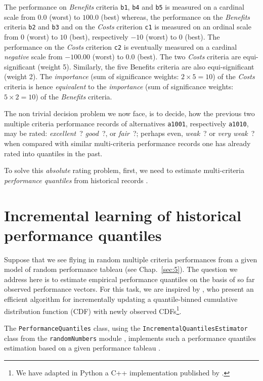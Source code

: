 The performance on \emph{Benefits} criteria \texttt{b1}, \texttt{b4} and \texttt{b5} is measured on a cardinal scale from $0.0$ (worst) to $100.0$ (best) whereas, the performance on the \emph{Benefits} criteria \texttt{b2} and \texttt{b3}  and on the \emph{Costs} criterion \texttt{c1} is measured on an ordinal scale from $0$ (worst) to $10$ (best), respectively $-10$ (worst) to $0$ (best). The performance on the \emph{Costs} criterion \texttt{c2} is eventually measured on a cardinal \emph{negative} scale from $-100.00$ (worst) to $0.0$ (best). The two \emph{Costs} criteria are equi-significant (weight 5). Similarly, the five Benefits criteria are also equi-significant (weight 2). The \emph{importance} (sum of significance weights: $2 \times 5 = 10$) of the \emph{Costs} criteria is hence \emph{equivalent} to the \emph{importance} (sum of significance weights: $5 \times 2 = 10$) of the \emph{Benefits} criteria.
   
The non trivial decision problem we now face, is to decide, how the previous two multiple criteria performance records of alternatives \texttt{a1001}, respectively \texttt{a1010},  may be rated: \emph{excellent}~? \emph{good}~?, or \emph{fair}~?; perhaps even, \emph{weak}~? or \emph{very weak}~? when compared with similar multi-criteria performance records one has already rated into quantiles in the past. 

To solve this \emph{absolute} rating problem, first, we need to estimate multi-criteria \emph{performance quantiles} from historical records \citep{CPSTAT-L5}.  

\section{Incremental learning of historical performance quantiles}
\label{sec:10.2}

Suppose that we see flying in random multiple criteria performances from a given model of random performance tableau (see Chap.~\ref{sec:5}). The question we address here is to estimate empirical performance quantiles on the basis of so far observed performance vectors. For this task, we are inspired by \citet{CHAM-2006}, who present an efficient algorithm for incrementally updating a quantile-binned cumulative distribution function (CDF) with newly observed CDFs\footnote{We have adapted in Python a C++ implementation published by \citep*[Chapter 5]{NR3-2007}.}. 

The \texttt{PerformanceQuantiles} class, using the \texttt{IncrementalQuan\-tiles\-Estimator} class from the \texttt{randomNumbers} module , implements such a performance quantiles estimation based on a given performance tableau \citep{BIS-2021b}.

